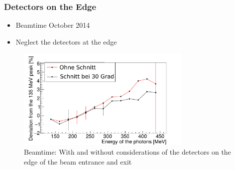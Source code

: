 \documentclass[slidestop,compress,mathserif]{beamer}
\begin{document}
\begin{frame}
	\frametitle{Detectors on the Edge}
	
	\begin{itemize}
		\item Beamtime October 2014
		\item Neglect the detectors at the edge
	\end{itemize}

\begin{figure}
	\includegraphics[width=0.75\textwidth]{Pictures/20170405StrahlzeitBothDeviation}
	\caption{Beamtime: With and without considerations of the detectors on the edge of the beam entrance and exit }
\end{figure}	
\end{frame}
\end{document}
